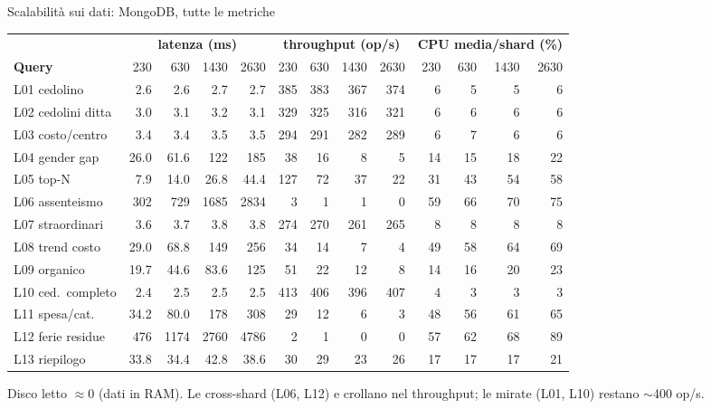 \documentclass[aspectratio=169,11pt]{beamer}
\begin{document}
\begin{frame}{Scalabilità sui dati: MongoDB, tutte le metriche}
  \centering
  \scriptsize
  \setlength{\tabcolsep}{4pt}
  \renewcommand{\arraystretch}{1.0}
  \begin{tabular}{@{}l rrrr rrrr rrrr@{}}
    \toprule
    & \multicolumn{4}{c}{\textbf{latenza (ms)}} & \multicolumn{4}{c}{\textbf{throughput (op/s)}}
    & \multicolumn{4}{c}{\textbf{CPU media/shard (\%)}} \\
    \cmidrule(lr){2-5}\cmidrule(lr){6-9}\cmidrule(lr){10-13}
    \textbf{Query} & 230 & 630 & 1430 & 2630 & 230 & 630 & 1430 & 2630 & 230 & 630 & 1430 & 2630 \\
    \midrule
    L01 cedolino      & 2.6 & 2.6 & 2.7 & 2.7 & 385 & 383 & 367 & 374 & 6 & 5 & 5 & 6 \\
    L02 cedolini ditta& 3.0 & 3.1 & 3.2 & 3.1 & 329 & 325 & 316 & 321 & 6 & 6 & 6 & 6 \\
    L03 costo/centro  & 3.4 & 3.4 & 3.5 & 3.5 & 294 & 291 & 282 & 289 & 6 & 7 & 6 & 6 \\
    L04 gender gap    & 26.0 & 61.6 & 122 & 185 & 38 & 16 & 8 & 5 & 14 & 15 & 18 & 22 \\
    L05 top-N         & 7.9 & 14.0 & 26.8 & 44.4 & 127 & 72 & 37 & 22 & 31 & 43 & 54 & 58 \\
    L06 assenteismo   & 302 & 729 & 1685 & 2834 & 3 & 1 & 1 & 0 & 59 & 66 & 70 & 75 \\
    L07 straordinari  & 3.6 & 3.7 & 3.8 & 3.8 & 274 & 270 & 261 & 265 & 8 & 8 & 8 & 8 \\
    L08 trend costo   & 29.0 & 68.8 & 149 & 256 & 34 & 14 & 7 & 4 & 49 & 58 & 64 & 69 \\
    L09 organico      & 19.7 & 44.6 & 83.6 & 125 & 51 & 22 & 12 & 8 & 14 & 16 & 20 & 23 \\
    L10 ced.\ completo& 2.4 & 2.5 & 2.5 & 2.5 & 413 & 406 & 396 & 407 & 4 & 3 & 3 & 3 \\
    L11 spesa/cat.    & 34.2 & 80.0 & 178 & 308 & 29 & 12 & 6 & 3 & 48 & 56 & 61 & 65 \\
    L12 ferie residue & 476 & 1174 & 2760 & 4786 & 2 & 1 & 0 & 0 & 57 & 62 & 68 & 89 \\
    L13 riepilogo     & 33.8 & 34.4 & 42.8 & 38.6 & 30 & 29 & 23 & 26 & 17 & 17 & 17 & 21 \\
    \bottomrule
  \end{tabular}
  \par
  {\scriptsize Disco letto ${\approx}0$ (dati in RAM). Le cross-shard (L06, L12)  e crollano nel throughput; le mirate (L01, L10) restano ${\sim}$400 op/s.}
\end{frame}
\end{document}
